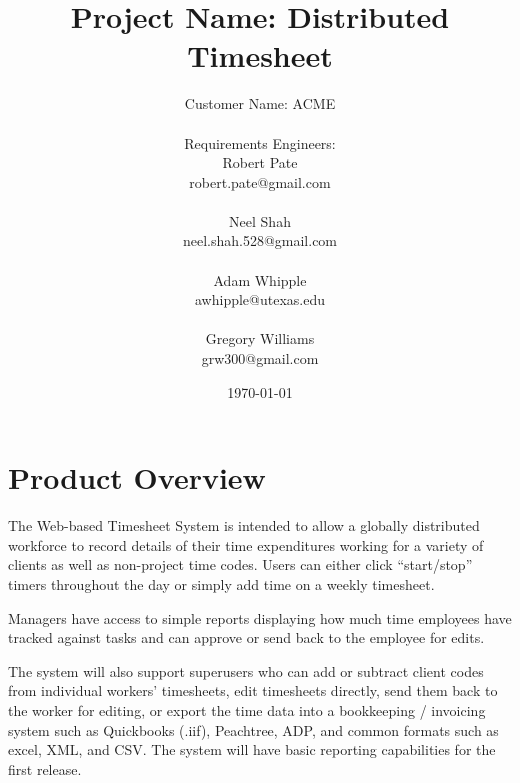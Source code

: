 \documentclass[12pt]{article}
\begin{document}
\begin{titlepage}
\title{{\Huge \color{cyan}Project Name: Distributed Timesheet}}
\author{{\huge{\color{blue}Customer Name: ACME}}\\
	\\{\small Requirements Engineers:}
\\Robert Pate\\robert.pate@gmail.com\\\\Neel Shah\\neel.shah.528@gmail.com\\\\Adam Whipple\\awhipple@utexas.edu\\\\Gregory Williams\\grw300@gmail.com}
\date{\today}



\maketitle
\vfill
\end{titlepage}

\section{Product Overview}

The Web-based Timesheet System is intended to allow a globally distributed workforce to record details of their time expenditures working for a variety of clients as well as non-project time codes.  Users can either click “start/stop” timers throughout the day or simply add time on a weekly timesheet.

Managers have access to simple reports displaying how much time employees have tracked against tasks and can approve or send back to the employee for edits.

The system will also support superusers who can add or subtract client codes from individual workers’ timesheets, edit timesheets directly, send them back to the worker for editing, or export the time data into a bookkeeping / invoicing system such as Quickbooks (.iif), Peachtree, ADP, and common formats such as excel, XML, and CSV. The system will have basic reporting capabilities for the first release.
\end{document}
